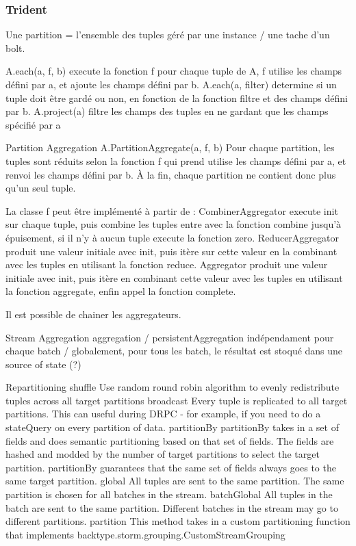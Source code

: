     \subsubsection{Trident}

      Une partition = l'ensemble des tuples géré par une instance / une tache d'un bolt.

      A.each(a, f, b)
        execute la fonction f pour chaque tuple de A, f utilise les champs défini par a, et ajoute les champs défini par b.
      A.each(a, filter)
        determine si un tuple doit être gardé ou non, en fonction de la fonction filtre et des champs défini par b.
      A.project(a)
        filtre les champs des tuples en ne gardant que les champs spécifié par a

      Partition Aggregation
        A.PartitionAggregate(a, f, b)
          Pour chaque partition, les tuples sont réduits selon la fonction f qui prend utilise les champs défini par a, et renvoi les champs défini par b.
          À la fin, chaque partition ne contient donc plus qu'un seul tuple.

          La classe f peut être implémenté à partir de :
          CombinerAggregator
            execute init sur chaque tuple, puis combine les tuples entre avec la fonction combine jusqu'à épuisement, si il n'y à aucun tuple execute la fonction zero.
          ReducerAggregator
            produit une valeur initiale avec init, puis itère sur cette valeur en la combinant avec les tuples en utilisant la fonction reduce.
          Aggregator
            produit une valeur initiale avec init, puis itère en combinant cette valeur avec les tuples en utilisant la fonction aggregate, enfin appel la fonction complete.

            Il est possible de chainer les aggregateurs.

      Stream Aggregation
        aggregation / persistentAggregation
        indépendament pour chaque batch / globalement, pour tous les batch, le résultat est stoqué dans une source of state (?)

      Repartitioning
        shuffle
          Use random round robin algorithm to evenly redistribute tuples across all target partitions
        broadcast
          Every tuple is replicated to all target partitions. This can useful during DRPC - for example, if you need to do a stateQuery on every partition of data.
        partitionBy
          partitionBy takes in a set of fields and does semantic partitioning based on that set of fields. The fields are hashed and modded by the number of target partitions to select the target partition. partitionBy guarantees that the same set of fields always goes to the same target partition.
        global
          All tuples are sent to the same partition. The same partition is chosen for all batches in the stream.
        batchGlobal
          All tuples in the batch are sent to the same partition. Different batches in the stream may go to different partitions.
        partition
          This method takes in a custom partitioning function that implements backtype.storm.grouping.CustomStreamGrouping

